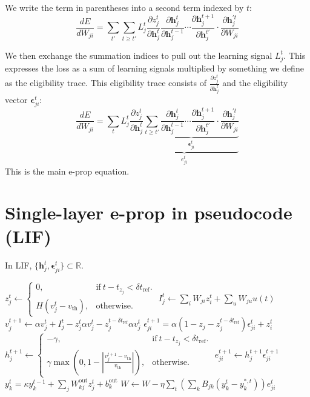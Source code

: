 \documentclass{article}
\begin{document}
We write the term in parentheses into a second term indexed by $t$:
\begin{equation}
\frac{dE}{dW_{ji}} = \sum_{t'}\sum_{t\geq t'}L^t_j\frac{\partial z_j^t}{\partial\mathbf{h}_j^t}\frac{\partial\mathbf{h}^t_j}{\partial\mathbf{h}_j^{t-1}} \cdots \frac{\partial\mathbf{h}_j^{t+1}}{\partial\mathbf{h}_j^{t'}}\cdot\frac{\partial\mathbf{h}_j^{'t}}{\partial W_{ji}}
\end{equation}

We then exchange the summation indices to pull out the learning signal $L_j^t$. This expresses the loss as a sum of learning signals multiplied by something we define as the eligibility trace. This eligibility trace consists of $\frac{\partial z_j^t}{\partial\mathbf{h}_j^t}$ and the eligibility vector $\mathbf{\epsilon}_{ji}^t$:
\begin{equation}
\frac{dE}{dW_{ji}} = \sum_tL^t_j\underbrace{\frac{\partial z_j^t}{\partial\mathbf{h}_j^t}\underbrace{\sum_{t\geq t'}\frac{\partial\mathbf{h}^t_j}{\partial\mathbf{h}_j^{t-1}} \cdots \frac{\partial\mathbf{h}_j^{t+1}}{\partial\mathbf{h}_j^{t'}}\cdot\frac{\partial\mathbf{h}_j^{'t}}{\partial W_{ji}}}_{\mathbf{\epsilon}_{ji}^t}}_{e^t_{ji}}
\end{equation}
This is the main e-prop equation.

\section{Single-layer e-prop in pseudocode (LIF)}
In LIF, $\{\mathbf{h}^t_j, \mathbf{\epsilon}^t_{ji}\} \subset \mathbb{R}$.

\begin{algorithmic}
	\State $z_j^t \gets \begin{cases}0, & \text{if}\ t - t_{z_j} < \delta t_\text{ref}.\\H(v_j^t - v_\text{th}), & \text{otherwise}.\end{cases}$
	\vspace{10pt}
	\State $I^t_j \gets \sum_i W_{ji}z_i^t + \sum_u W_{ju}u(t) $
	\vspace{10pt}
	\State $v_j^{t+1} \gets \alpha v_j^t + I_j^t - z_j^t\alpha v_j^t - z^{t-\delta t_\text{ref}}_j\alpha v_j^t$
	\vspace{10pt}
	\State $\epsilon^{t+1}_{ji} = \alpha(1-z_j-z_j^{t-\delta t_\text{ref}})\epsilon^t_{ji} + z^t_i$
	\vspace{10pt}
	\State $h_j^{t+1} \gets \begin{cases}-\gamma, & \text{if}\ t - t_{z_j} < \delta t_\text{ref}.\\\gamma\max\left(0, 1-\left|\frac{v_j^{t+1}-v_\text{th}}{v_\text{th}}\right|\right), & \text{otherwise}.\end{cases}$
	\vspace{10pt}
	\State $e^{t+1}_{ji} \gets h^{t+1}_j\epsilon^{t+1}_{ji}$
	\vspace{10pt}
	\State $y^t_k = \kappa y^{t-1}_k + \sum_j W^\text{out}_{kj} z^t_j + b^\text{out}_k$
	\vspace{10pt}
	\State $W \gets W - \eta \sum_t\left(\sum_k B_{jk}\left(y_k^t - y_k^{*,t}\right)\right)e^t_{ji}$
	
\EndFor
\end{algorithmic}
\end{document}
